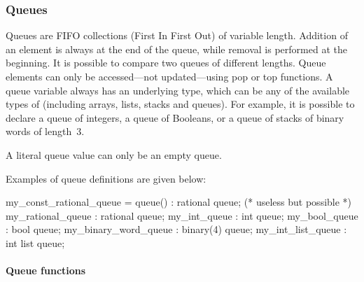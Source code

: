 \subsubsection{Queues}

Queues are FIFO collections (First In First Out) of variable length.
Addition of an element is always at the end of the queue, while removal is performed at the beginning.
It is possible to compare two queues of different lengths.
Queue elements can only be accessed---not updated---using pop or top functions.
A queue variable always has an underlying type, which can be any of the available types of \imitator{} (including arrays, lists, stacks and queues).
For example, it is possible to declare a queue of integers, a queue of Booleans, or a queue of stacks of binary words of length~3.

\begin{remark}
A literal queue value can only be an empty queue.
\end{remark}

Examples of queue definitions are given below:

\begin{IMITATORmodel}
	my_const_rational_queue = queue() : rational queue; (* useless but possible *)
	my_rational_queue			: rational queue;
	my_int_queue					: int queue;
	my_bool_queue        	: bool queue;
	my_binary_word_queue 	: binary(4) queue;
	my_int_list_queue     : int list queue;
\end{IMITATORmodel}


\paragraph{Queue functions}

